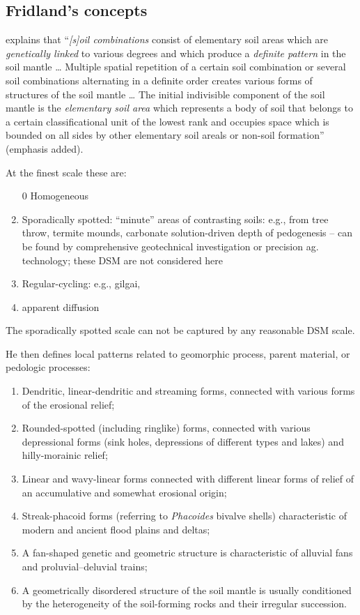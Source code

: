 \documentclass[soil, manuscript]{copernicus}
\begin{document}
\subsection{Fridland's concepts}

\par
\citet{Fridland1974} explains that ``\emph{[s]oil combinations} consist of elementary soil areas which are \emph{genetically linked} to various degrees and which produce a \emph{definite pattern} in the soil mantle
%
\ldots
%
Multiple spatial repetition of a certain soil combination or several soil combinations alternating in a definite order creates various forms of structures of the soil mantle
%
\ldots
%
The initial indivisible component of the soil mantle is the \emph{elementary soil area} which represents a body of soil that belongs to a certain classificational unit of the lowest rank and occupies space which is bounded on all sides by other elementary soil areals or non-soil formation'' (emphasis added).

\par
At the finest scale these are:

\begin{enumerate}
\item[0] Homogeneous
\item Sporadically spotted: ``minute'' areas of contrasting soils: e.g., from tree throw, termite mounds,  carbonate solution-driven  depth of pedogenesis
-- can be found by comprehensive geotechnical investigation or precision ag. technology; these DSM are not considered here
\item Regular-cycling: e.g.,  gilgai,
\item apparent diffusion
\end{enumerate}

The sporadically spotted scale can not be captured by any reasonable DSM scale.

He then defines local patterns related to geomorphic process, parent material, or pedologic processes:

\begin{enumerate}
\item Dendritic, linear-dendritic and streaming forms, connected with various forms of the erosional relief;
\item  Rounded-spotted (including ringlike) forms, connected with various depressional forms (sink holes, depressions of different types and lakes) and hilly-morainic relief;
\item  Linear and wavy-linear forms connected with different linear forms of relief of an accumulative and somewhat erosional origin;
\item  Streak-phacoid forms (referring to \emph{Phacoides} bivalve shells)  characteristic of modern and ancient flood plains and deltas;
\item  A fan-shaped genetic and geometric structure is characteristic of alluvial fans and proluvial--deluvial trains;
\item A geometrically disordered structure of the soil mantle is usually conditioned by the heterogeneity of the soil-forming rocks and their irregular succession.
\end{enumerate}
\end{document}
